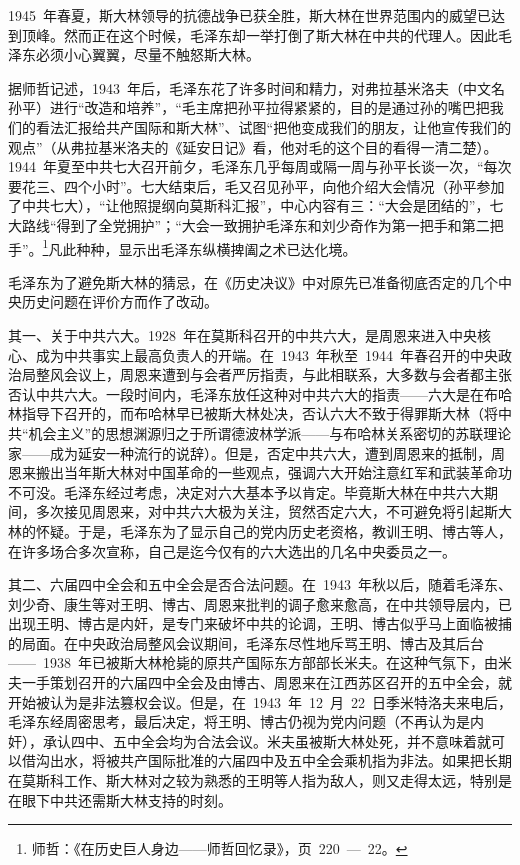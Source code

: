 1945~年春夏，斯大林领导的抗德战争已获全胜，斯大林在世界范围内的威望已达到顶峰。然而正在这个时候，毛泽东却一举打倒了斯大林在中共的代理人。因此毛泽东必须小心翼翼，尽量不触怒斯大林。

据师哲记述，1943~年后，毛泽东花了许多时间和精力，对弗拉基米洛夫（中文名孙平）进行“改造和培养”，“毛主席把孙平拉得紧紧的，目的是通过孙的嘴巴把我们的看法汇报给共产国际和斯大林”、试图“把他变成我们的朋友，让他宣传我们的观点”（从弗拉基米洛夫的《延安日记》看，他对毛的这个目的看得一清二楚）。1944~年夏至中共七大召开前夕，毛泽东几乎每周或隔一周与孙平长谈一次，“每次要花三、四个小时”。七大结束后，毛又召见孙平，向他介绍大会情况（孙平参加了中共七大），“让他照提纲向莫斯科汇报”，中心内容有三：“大会是团结的”，七大路线“得到了全党拥护”；“大会一致拥护毛泽东和刘少奇作为第一把手和第二把手”。\footnote{师哲：《在历史巨人身边——师哲回忆录》，页~220~—~22。}凡此种种，显示出毛泽东纵横捭阖之术已达化境。

毛泽东为了避免斯大林的猜忌，在《历史决议》中对原先已准备彻底否定的几个中央历史问题在评价方而作了改动。

其一、关于中共六大。1928~年在莫斯科召开的中共六大，是周恩来进入中央核心、成为中共事实上最高负责人的开端。在~1943~年秋至~1944~年春召开的中央政治局整风会议上，周恩来遭到与会者严厉指责，与此相联系，大多数与会者都主张否认中共六大。一段时间内，毛泽东放任这种对中共六大的指责——六大是在布哈林指导下召开的，而布哈林早已被斯大林处决，否认六大不致于得罪斯大林（将中共“机会主义”的思想渊源归之于所谓德波林学派——与布哈林关系密切的苏联理论家——成为延安一种流行的说辞）。但是，否定中共六大，遭到周恩来的抵制，周恩来搬出当年斯大林对中国革命的一些观点，强调六大开始注意红军和武装革命功不可没。毛泽东经过考虑，决定对六大基本予以肯定。毕竟斯大林在中共六大期间，多次接见周恩来，对中共六大极为关注，贸然否定六大，不可避免将引起斯大林的怀疑。于是，毛泽东为了显示自己的党内历史老资格，教训王明、博古等人，在许多场合多次宣称，自己是迄今仅有的六大选出的几名中央委员之一。

其二、六届四中全会和五中全会是否合法问题。在~1943~年秋以后，随着毛泽东、刘少奇、康生等对王明、博古、周恩来批判的调子愈来愈高，在中共领导层内，已出现王明、博古是内奸，是专门来破坏中共的论调，王明、博古似乎马上面临被捕的局面。在中央政治局整风会议期间，毛泽东尽性地斥骂王明、博古及其后台——~1938~年已被斯大林枪毙的原共产国际东方部部长米夫。在这种气氛下，由米夫一手策划召开的六届四中全会及由博古、周恩来在江西苏区召开的五中全会，就开始被认为是非法篡权会议。但是，在~1943~年~12~月~22~日季米特洛夫来电后，毛泽东经周密思考，最后决定，将王明、博古仍视为党内问题（不再认为是内奸），承认四中、五中全会均为合法会议。米夫虽被斯大林处死，并不意味着就可以借沟出水，将被共产国际批准的六届四中及五中全会乘机指为非法。如果把长期在莫斯科工作、斯大林对之较为熟悉的王明等人指为敌人，则又走得太远，特别是在眼下中共还需斯大林支持的时刻。

